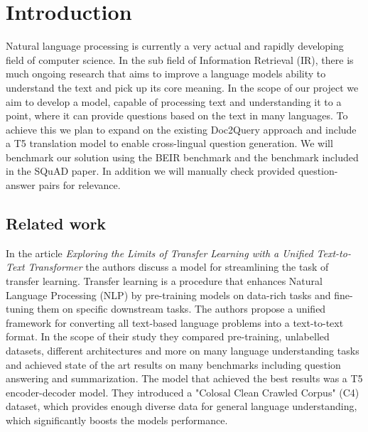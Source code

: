 \documentclass[fleqn,moreauthors,10pt]{ds_report}
\affiliation{\textit{Advisors: Slavko Žitnik}}
\begin{document}
\flushbottom 

\maketitle 

\thispagestyle{empty} 


\section*{Introduction}
Natural language processing is currently a very actual and rapidly developing field of computer science. In the sub field of Information Retrieval (IR), there is much ongoing research that aims to improve a language models ability to understand the text and pick up its core meaning. In the scope of our project we aim to develop a model, capable of processing text and understanding it to a point, where it can provide questions based on the text in many languages. To achieve this we plan to expand on the existing Doc2Query approach and include a T5 translation model to enable cross-lingual question generation. We will benchmark our solution using the BEIR\cite{DBLP:journals/corr/abs-2104-08663} benchmark and the benchmark included in the SQuAD\cite{DBLP:journals/corr/RajpurkarZLL16} paper. In addition we will manually check provided question-answer pairs for relevance.

\subsection{Related work}

In the article \textit{Exploring the Limits of Transfer Learning with a Unified Text-to-Text Transformer}\cite{DBLP:journals/corr/abs-1910-10683} the authors discuss a model for streamlining the task of transfer learning. Transfer learning is a procedure that enhances Natural Language Processing (NLP) by pre-training models on data-rich tasks and fine-tuning them on specific downstream tasks. The authors propose a unified framework for converting all text-based language problems into a text-to-text format. In the scope of their study they compared pre-training, unlabelled datasets, different architectures and more on many language understanding tasks and achieved state of the art results on many benchmarks including question answering and summarization. The model that achieved the best results was a T5 encoder-decoder model. They introduced a "Colosal Clean Crawled Corpus" (C4) dataset, which provides enough diverse data for general language understanding, which significantly boosts the models performance.
\end{document}

